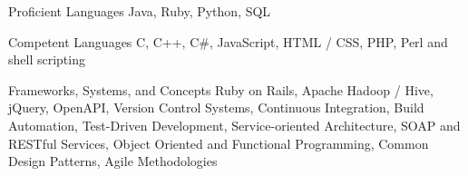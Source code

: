 
\begin{cvskills}

\cvskill
{Proficient Languages}
{Java, Ruby, Python, SQL}

\cvskill
{Competent Languages}
{C, C++, C\#, JavaScript, HTML / CSS, PHP, Perl and shell scripting}

\cvskill
{Frameworks, Systems, and Concepts}
{Ruby on Rails, Apache Hadoop / Hive, jQuery, OpenAPI, Version Control Systems, Continuous Integration, Build Automation, Test-Driven Development, Service-oriented Architecture, SOAP and RESTful Services, Object Oriented and Functional Programming, Common Design Patterns, Agile Methodologies}

\end{cvskills}